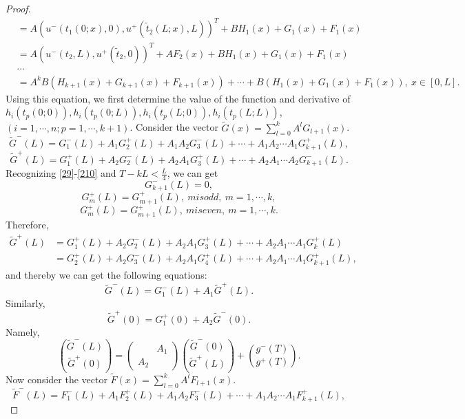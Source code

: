 \documentclass[a4paper,reqno,11pt]{amsart}
\numberwithin{equation}{section} %
\begin{document}
\begin{proof}
\begin{equation}
\begin{aligned}
							   &=A(u^- (t _1(0;x) ,0) ,u^+ (\tilde{t} _2 (L;x),L))^T + BH _1(x)+G_1(x)+F_1(x)\\
							   &=A(u^- (t _2 ,L) ,u^+ (\tilde{t} _2 ,0))^T +AF_2(x)+ BH _1(x)+G_1(x)+F_1(x)\\
							   & \cdots \\
							   &=A^kB(H_{k+1}\left( x \right)+G_{k+1}\left( x \right)+F_{k+1}\left( x \right)) +\cdots  +B(H_1\left( x \right)+G_1\left( x \right)+F_1\left( x \right)) ,\ x\in \left[ 0,L \right].
	\end{aligned}
	\end{equation}
Using this equation, we first determine the value of the function and derivative of $h_i(t_p(0;0)),h_i(t_p(0;L)),h_i(t_p(L;0)),h_i(t_p(L;L))$,$(i=1,\cdots,n; p=1,\cdots,k+1)$.
Consider the vector $\tilde{G}  (x) = \sum_{l=0}^k A^l G _{l+1}(x)$.
$$
\tilde{G}^-  (L) =G^- _1 (L) +A_1 G^+ _2 (L) +A_1 A_2 G^- _3 (L)  +\cdots +A_1 A_2 \cdots A_1 G^+ _{k+1} (L) ,
$$
$$
\tilde{G}^+  (L) =G^+ _1 (L) +A_2 G^- _2 (L) +A_2 A_1 G^+ _3 (L)  +\cdots +A_2 A_1 \cdots A_2 G^- _{k+1} (L) .
$$
Recognizing \eqref{29}-\eqref{210} and $T-kL < \frac{L}{4}$, we can get 
$$
G^- _{k+1}(L)=0,
$$
$$
G^+ _{m}(L) =G^+ _{m+1}(L) ,\ m is odd ,\ m=1,\cdots ,k,
$$
$$
G^+ _{m}(L) =G^+ _{m+1}(L) ,\ m is even ,\ m=1,\cdots ,k.
$$
Therefore,
\begin{equation}
	\begin{aligned}
		\tilde{G}^+  (L) &=G^+ _1 (L) +A_2 G^- _2 (L) +A_2 A_1 G^+ _3 (L)  +\cdots +A_2 A_1 \cdots A_1 G^+ _{k} (L) \\
		                 &=G^+ _2 (L) +A_2 G^- _3 (L) +A_2 A_1 G^+ _4 (L)  +\cdots +A_2 A_1 \cdots A_1 G^+ _{k+1} (L) ,
	\end{aligned}
\end{equation}
and thereby we can get the following equations:
$$
\tilde{G}^-  (L) =G^- _1 (L) +A_1 \tilde{G} ^+  (L) .
$$
Similarly,
$$
\tilde{G}^+  (0) =G^+ _1 (0) +A_2 \tilde{G} ^-  (0) .
$$
Namely, 
\begin{equation}\label{20}
    \binom{\tilde{G} ^{-}(L)}{\tilde{G}^{+}(0)}=\left(\begin{array}{ll} 
        & A_1 \\
        A_2 &
    \end{array}\right)\binom{\tilde{G}^{-}(0)}{\tilde{G} ^{+}(L)}+ \binom{g ^{-}(T)}{g ^{+}(T)}.
\end{equation}
Now consider the vector $\tilde{F}  (x) = \sum_{l=0}^k A^l F _{l+1}(x)$.
$$
\tilde{F}^-  (L) =F^- _1 (L) +A_1 F^+ _2 (L) +A_1 A_2 F^- _3 (L)  +\cdots +A_1 A_2 \cdots A_1 F^+ _{k+1} (L) ,
$$
\end{proof}
\end{document}
